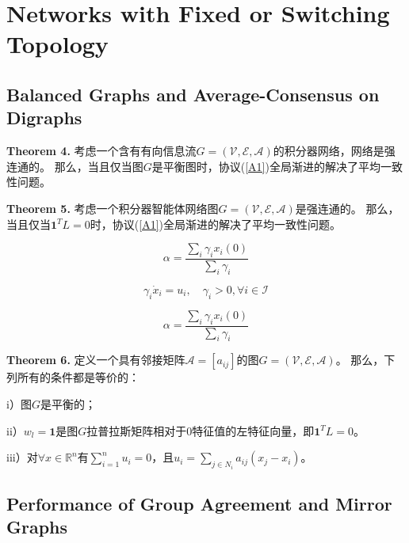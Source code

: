\documentclass{article}
\begin{document}
\section{Networks with Fixed or Switching Topology}
\subsection{Balanced Graphs and Average-Consensus on Digraphs}

\noindent \textbf{Theorem 4.} 考虑一个含有有向信息流$G=(\mathcal{V}, \mathcal{E}, \mathcal{A})$的积分器网络，网络是强连通的。
那么，当且仅当图$G$是平衡图时，协议(\ref{A1})全局渐进的解决了平均一致性问题。

\noindent \textbf{Theorem 5.} 考虑一个积分器智能体网络图$G=(\mathcal{V}, \mathcal{E}, \mathcal{A})$是强连通的。
那么，当且仅当$\mathbf{1}^TL=0$时，协议(\ref{A1})全局渐进的解决了平均一致性问题。

\begin{equation}
    \alpha = \frac{\sum_i \gamma_ix_i(0)}{\sum_i\gamma_i}
    \tag{19}
    \label{19}
\end{equation}

\begin{equation}
    \gamma_i \dot{x}_i=u_i,\quad \gamma_i>0,\forall i \in \mathcal{I}
    \tag{20}
    \label{20}
\end{equation}

\begin{equation}
    \alpha = \frac{\sum_i \gamma_ix_i(0)}{\sum_i\gamma_i}
    \tag{21}
    \label{21}
\end{equation}

\noindent \textbf{Theorem 6.} 定义一个具有邻接矩阵$\mathcal{A}=[a_{ij}]$的图$G=(\mathcal{V}, \mathcal{E}, \mathcal{A})$。
那么，下列所有的条件都是等价的：

i）图$G$是平衡的；

ii）$w_l = \mathbf{1}$是图$G$拉普拉斯矩阵相对于0特征值的左特征向量，即$\mathbf{1}^TL = 0$。

iii）对$\forall x \in \mathbb{R}^n$有$\sum_{i=1}^n u_i = 0$，且$u_i = \sum_{j\in N_i}a_{ij}(x_j - x_i)$。

\subsection{Performance of Group Agreement and Mirror Graphs}
\end{document}
